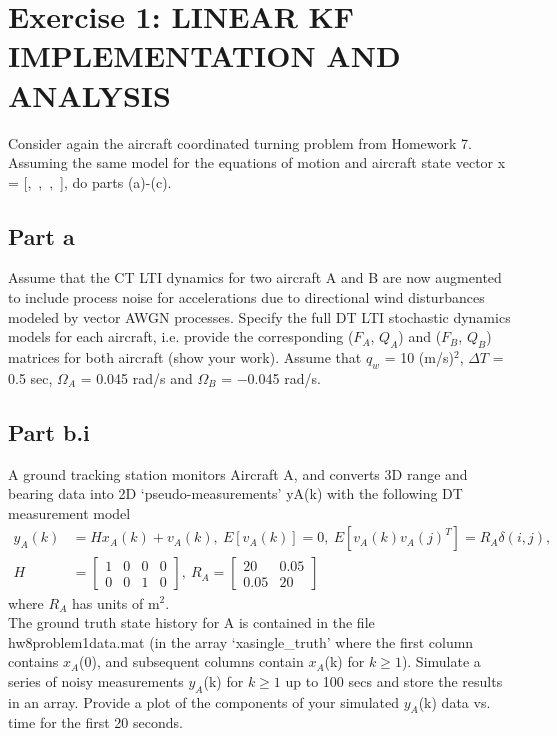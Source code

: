 \documentclass[11pt]{article}
\begin{document}
\thispagestyle{empty}

\newlength{\boxlength}\setlength{\boxlength}{\textwidth}
\addtolength{\boxlength}{-4mm}

\begin{center}
\end{center}




\section*{Exercise 1: LINEAR KF IMPLEMENTATION AND ANALYSIS}
Consider again the aircraft coordinated turning problem from Homework 7. Assuming the same model for the equations of motion and aircraft state vector x = [\xi,\ \dot{\xi},\ \eta,\ \dot{\eta}], do parts (a)-(c).

\subsection*{Part a}
Assume that the CT LTI dynamics for two aircraft A and B are now augmented to include process noise for accelerations due to directional wind disturbances modeled by vector AWGN processes. Specify the full DT LTI stochastic dynamics models for each aircraft, i.e. provide the corresponding ($F_A$, $Q_A$) and ($F_B$, $Q_B$) matrices for both aircraft (show your work). Assume that $q_w$ = 10 (m/s)$^2$, $\Delta T$ = 0.5 sec, $\Omega_A$ = 0.045 rad/s and $\Omega_B$ = −0.045 rad/s.

\subsection*{Part b.i}
A ground tracking station monitors Aircraft A, and converts 3D range and bearing data into 2D ‘pseudo-measurements’ yA(k) with the following DT measurement model 
\begin{align*}
y_A(k) &= H x_A(k) + v_A(k),\ E[v_A(k)] = 0,\ E[v_A(k) v_A(j)^T] = R_A \delta(i, j),  \\
H &= 
\begin{bmatrix} 1 & 0 & 0 & 0 \\ 0 & 0 & 1 & 0 \end{bmatrix}
,\ R_A = 
\begin{bmatrix}
20 & 0.05 \\ 0.05 & 20
\end{bmatrix}
\end{align*}
where $R_A$ has units of m$^2$. \\ 
The ground truth state history for A is contained in the file hw8problem1data.mat (in the array ‘xasingle\_truth’ where the first column contains $x_A$(0), and subsequent columns
contain $x_A$(k) for $k \geq 1$). Simulate a series of noisy measurements $y_A$(k) for $k \geq 1$ up
to 100 secs and store the results in an array. Provide a plot of the components of your
simulated $y_A$(k) data vs. time for the first 20 seconds.
\end{document}
